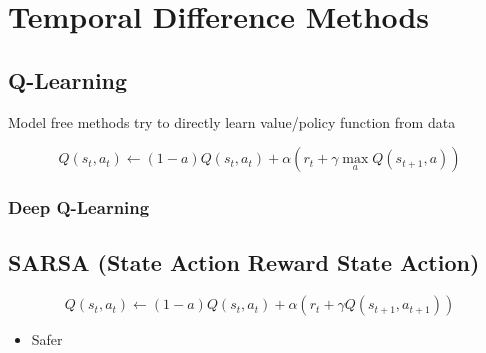 \chapter{Temporal Difference Methods}

\section{Q-Learning}

  Model free methods try to directly learn value/policy function from data

  \begin{equation}
    Q\left( s_{t}, a_{t} \right) \leftarrow
      \left( 1 - a \right) Q\left( s_{t}, a_{t} \right)
      + \alpha \left( r_{t} + \gamma \max_{a} Q\left( s_{t + 1}, a \right) \right)
  \end{equation}

  \subsection{Deep Q-Learning}

\section{SARSA (State Action Reward State Action)}

  \begin{equation}
    Q\left( s_{t}, a_{t} \right) \leftarrow
      \left( 1 - a \right) Q\left( s_{t}, a_{t} \right)
      + \alpha \left( r_{t} + \gamma Q\left( s_{t + 1}, a_{t + 1} \right) \right)
  \end{equation}

  \begin{itemize}
    \item Safer
  \end{itemize}
